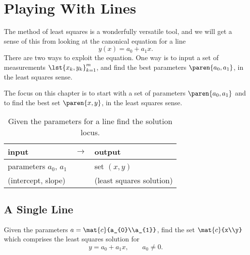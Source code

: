 \chapter{Playing With Lines}

The method of least squares is a wonderfully versatile tool, and we will get a sense of this from looking at the canonical equation for a line
  \begin{equation*}   %
      y(x) = a_{0} + a_{1} x.
  \end{equation*}
There are two ways to exploit the equation. One way is to input a set of measurements $\lst{x_{k},y_{k}}_{k=1}^{m}$, and find the best parameters $\paren{a_{0},a_{1}}$, in the least squares sense. 

The focus on this chapter is to start with a set of parameters $\paren{a_{0},a_{1}}$ and to find the best set $\paren{x, y}$, in the least squares sense.	

\begin{table}[htbp]  %
    \caption{Given the parameters for a line find the solution locus.}
    		\begin{center}
        	\begin{tabular}{lcl}
            input & $\rightarrow$ & output \\\hline
            parameters $a_{0}$, $a_{1}$ && set $(x, y)$\\
						(intercept, slope) && (least squares solution)	
        	\end{tabular}
    		\end{center}
\end{table}%

\section{A Single Line}  %

Given the parameters $a=\mat{c}{a_{0}\\a_{1}}$, find the set $\mat{c}{x\\y}$ which comprises the least squares solution for
  \begin{equation}   %
      y = a_{0} + a_{1} x, \qquad a_{0} \ne 0.
   \label{eq:myline}
  \end{equation}


